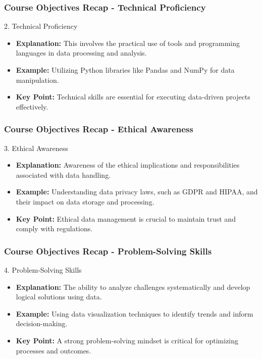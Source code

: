 \documentclass[aspectratio=169]{beamer}
\begin{document}
\begin{frame}[fragile]
    \frametitle{Course Objectives Recap - Technical Proficiency}
    \begin{block}{2. Technical Proficiency}
        \begin{itemize}
            \item \textbf{Explanation:} This involves the practical use of tools and programming languages in data processing and analysis.
            \item \textbf{Example:} Utilizing Python libraries like Pandas and NumPy for data manipulation.
            \item \textbf{Key Point:} Technical skills are essential for executing data-driven projects effectively.
        \end{itemize}
    \end{block}
\end{frame}

\begin{frame}[fragile]
    \frametitle{Course Objectives Recap - Ethical Awareness}
    \begin{block}{3. Ethical Awareness}
        \begin{itemize}
            \item \textbf{Explanation:} Awareness of the ethical implications and responsibilities associated with data handling.
            \item \textbf{Example:} Understanding data privacy laws, such as GDPR and HIPAA, and their impact on data storage and processing.
            \item \textbf{Key Point:} Ethical data management is crucial to maintain trust and comply with regulations.
        \end{itemize}
    \end{block}
\end{frame}

\begin{frame}[fragile]
    \frametitle{Course Objectives Recap - Problem-Solving Skills}
    \begin{block}{4. Problem-Solving Skills}
        \begin{itemize}
            \item \textbf{Explanation:} The ability to analyze challenges systematically and develop logical solutions using data.
            \item \textbf{Example:} Using data visualization techniques to identify trends and inform decision-making.
            \item \textbf{Key Point:} A strong problem-solving mindset is critical for optimizing processes and outcomes.
        \end{itemize}
    \end{block}
\end{frame}
\end{document}
